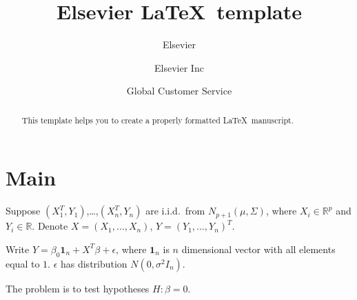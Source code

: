 \documentclass[review]{elsarticle}
\theoremstyle{plain}
\theoremstyle{definition}
\theoremstyle{remark}
\begin{document}
\begin{frontmatter}

\title{Elsevier \LaTeX\ template}

\author{Elsevier}
\address{Radarweg 29, Amsterdam}

\author[mymainaddress,mysecondaryaddress]{Elsevier Inc}

\author[mysecondaryaddress]{Global Customer Service}

\address[mymainaddress]{1600 John F Kennedy Boulevard, Philadelphia}
\address[mysecondaryaddress]{360 Park Avenue South, New York}

\begin{abstract}
This template helps you to create a properly formatted \LaTeX\ manuscript.
\end{abstract}

\begin{keyword}
\end{keyword}

\end{frontmatter}


\section{Main}

Suppose $(X_1^T,Y_1)$,\ldots,$(X_n^T, Y_n)$ are i.i.d.\ from $N_{p+1}(\mu,\Sigma)$,
where $X_i\in \mathbb{R}^p$ and $Y_i\in \mathbb{R}$. 
Denote $X=(X_1,\ldots,X_n)$, $Y={(Y_1,\ldots,Y_n)}^T$.

Write $Y=\beta_0 \textbf{1}_n+X^T \beta+\epsilon$, where $\textbf{1}_n$ is $n$ dimensional vector with all elements equal to $1$. $\epsilon$ has distribution $N(0,\sigma^2 I_n)$.

The problem is to test hypotheses $H: \beta=0$.


\end{document}
